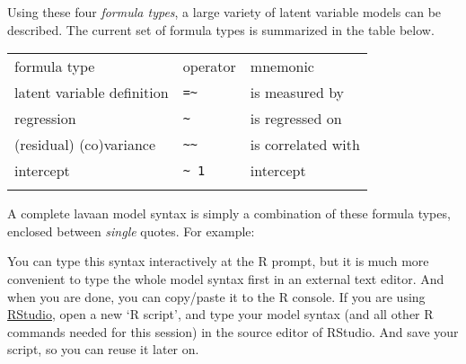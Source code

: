 Using these four \emph{formula types}, a large variety of latent
variable models can be described. The current set of formula types is
summarized in the table below.

\begin{longtable}[c]{@{}lll@{}}
\hline\noalign{\medskip}
formula type & operator & mnemonic
\\\noalign{\medskip}
\hline\noalign{\medskip}
latent variable definition & \texttt{=\textasciitilde{}} & is measured
by
\\\noalign{\medskip}
regression & \texttt{\textasciitilde{}} & is regressed on
\\\noalign{\medskip}
(residual) (co)variance & \texttt{\textasciitilde{}\textasciitilde{}} &
is correlated with
\\\noalign{\medskip}
intercept & \texttt{\textasciitilde{} 1} & intercept
\\\noalign{\medskip}
\hline
\end{longtable}

A complete lavaan model syntax is simply a combination of these formula
types, enclosed between \emph{single} quotes. For example:

\begin{Shaded}
\begin{Highlighting}[]



\end{Highlighting}
\end{Shaded}

You can type this syntax interactively at the R prompt, but it is much
more convenient to type the whole model syntax first in an external text
editor. And when you are done, you can copy/paste it to the R console.
If you are using \href{http://www.rstudio.com/}{RStudio}, open a new `R
script', and type your model syntax (and all other R commands needed for
this session) in the source editor of RStudio. And save your script, so
you can reuse it later on.

